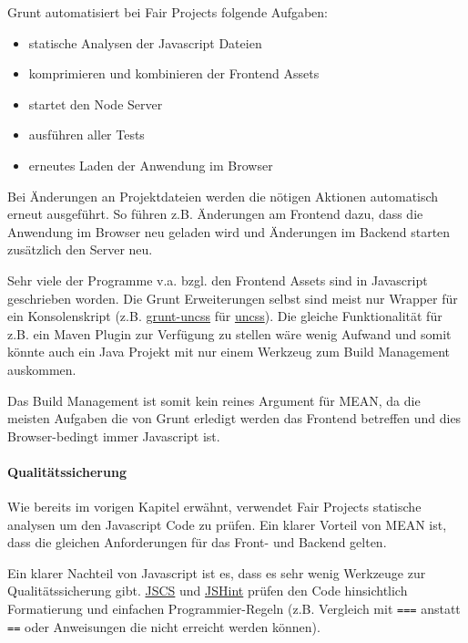 Grunt automatisiert bei Fair Projects folgende Aufgaben:

\begin{itemize}
\itemsep1pt\parskip0pt
\item
  statische Analysen der Javascript Dateien
\item
  komprimieren und kombinieren der Frontend Assets
\item
  startet den Node Server
\item
  ausführen aller Tests
\item
  erneutes Laden der Anwendung im Browser
\end{itemize}

Bei Änderungen an Projektdateien werden die nötigen Aktionen automatisch
erneut ausgeführt. So führen z.B. Änderungen am Frontend dazu, dass die
Anwendung im Browser neu geladen wird und Änderungen im Backend starten
zusätzlich den Server neu.

Sehr viele der Programme v.a. bzgl. den Frontend Assets sind in
Javascript geschrieben worden. Die Grunt Erweiterungen selbst sind meist
nur Wrapper für ein Konsolenskript (z.B.
\href{https://github.com/addyosmani/grunt-uncss}{grunt-uncss} für
\href{https://github.com/giakki/uncss}{uncss}). Die gleiche
Funktionalität für z.B. ein Maven Plugin zur Verfügung zu stellen wäre
wenig Aufwand und somit könnte auch ein Java Projekt mit nur einem
Werkzeug zum Build Management auskommen.

Das Build Management ist somit kein reines Argument für MEAN, da die
meisten Aufgaben die von Grunt erledigt werden das Frontend betreffen
und dies Browser-bedingt immer Javascript ist.

\paragraph{Qualitätssicherung}\label{qualituxe4tssicherung}

Wie bereits im vorigen Kapitel erwähnt, verwendet Fair Projects
statische analysen um den Javascript Code zu prüfen. Ein klarer Vorteil
von MEAN ist, dass die gleichen Anforderungen für das Front- und Backend
gelten.

Ein klarer Nachteil von Javascript ist es, dass es sehr wenig Werkzeuge
zur Qualitätssicherung gibt. \href{http://jscs.info/}{JSCS} und
\href{http://jshint.com/}{JSHint} prüfen den Code hinsichtlich
Formatierung und einfachen Programmier-Regeln (z.B. Vergleich mit
\texttt{===} anstatt \texttt{==} oder Anweisungen die nicht erreicht
werden können).

